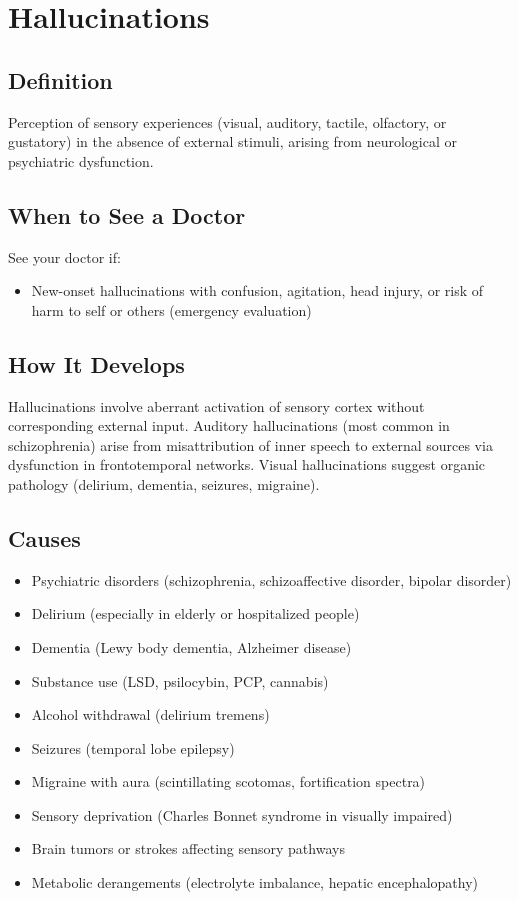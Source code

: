 \chapter{Hallucinations}

\section*{Definition}
Perception of sensory experiences (visual, auditory, tactile, olfactory, or gustatory) in the absence of external stimuli, arising from neurological or psychiatric dysfunction.

\section*{When to See a Doctor}
See your doctor if:
\begin{itemize}
  \item New-onset hallucinations with confusion, agitation, head injury, or risk of harm to self or others (emergency evaluation)
\end{itemize}

\section*{How It Develops}
Hallucinations involve aberrant activation of sensory cortex without corresponding external input. Auditory hallucinations (most common in schizophrenia) arise from misattribution of inner speech to external sources via dysfunction in frontotemporal networks. Visual hallucinations suggest organic pathology (delirium, dementia, seizures, migraine).

\section*{Causes}
\begin{itemize}
  \item Psychiatric disorders (schizophrenia, schizoaffective disorder, bipolar disorder)
  \item Delirium (especially in elderly or hospitalized people)
  \item Dementia (Lewy body dementia, Alzheimer disease)
  \item Substance use (LSD, psilocybin, PCP, cannabis)
  \item Alcohol withdrawal (delirium tremens)
  \item Seizures (temporal lobe epilepsy)
  \item Migraine with aura (scintillating scotomas, fortification spectra)
  \item Sensory deprivation (Charles Bonnet syndrome in visually impaired)
  \item Brain tumors or strokes affecting sensory pathways
  \item Metabolic derangements (electrolyte imbalance, hepatic encephalopathy)
\end{itemize}

